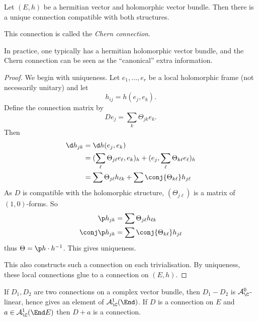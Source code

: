 \documentclass[a4paper]{article}
\begin{document}
\begin{proposition}
  Let \((E, h)\) be a hermitian vector and holomorphic vector bundle. Then there is a unique connection compatible with both structures.
\end{proposition}

\begin{definition}
  This connection is called the \emph{Chern connection}.
\end{definition}

\begin{remark}
  In practice, one typically has a hermitian holomorphic vector bundle, and the Chern connection can be seen as the ``canonical'' extra information.
\end{remark}

\begin{proof}
  We begin with uniqueness. Let \(e_1, \dots, e_r\) be a local holomorphic frame (not necessarily unitary) and let
  \[
    h_{ij} = h(e_j, e_k).
  \]
  Define the connection matrix by
  \[
    De_j = \sum_k \Theta_{jk} e_k.
  \]
  Then
  \begin{align*}
    \d h_{jk}
    &= \d h(e_j, e_k) \\
    &= (\sum_\ell \Theta_{j\ell} e_\ell, e_k)_h + (e_j, \sum_\ell \Theta_{k\ell} e_\ell)_h \\
    &= \sum \Theta_{j\ell} h_{\ell k} + \sum \conj{\Theta_{k\ell}} h_{j\ell}
  \end{align*}
  As \(D\) is compatible with the holomorphic structure, \((\Theta_{j\ell})\) is a matrix of \((1, 0)\)-forms. So
  \begin{align*}
    \p h_{jk} &= \sum \Theta_{j\ell} h_{\ell k} \\
    \conj \p h_{jk} &= \sum \conj{\Theta_{k\ell}} h_{j\ell}
  \end{align*}
  thus \(\Theta =  \p h \cdot h^{-1}\). This gives uniqueness.

  This also constructs such a connection on each trivialisation. By uniqueness, these local connections glue to a connection on \((E, h)\).
\end{proof}

\begin{lemma}
  If \(D_1, D_2\) are two connections on a complex vector bundle, then \(D_1 - D_2\) is \(\mathcal A_\C^0\)-linear, hence gives an element of \(\mathcal A^1_\C(\End)\). If \(D\) is a connection on \(E\) and \(a \in \mathcal A_\C^1(\End E)\) then \(D + a\) is a connection.
\end{lemma}
\end{document}
